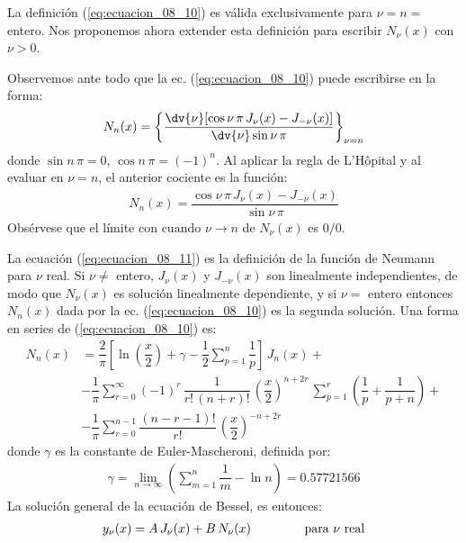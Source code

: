 \par
La definición (\ref{eq:ecuacion_08_10}) es válida exclusivamente para $\nu = n =$ entero. Nos proponemos ahora extender esta definición para escribir $N_{\nu} (x)$ con $\nu > 0$.
\par
Observemos ante todo que la ec. (\ref{eq:ecuacion_08_10}) puede escribirse en la forma:
\begin{align*}
N_{n} (x) =  \left\{ \dfrac{\displaystyle \dv{{\nu}} [\cos \nu \, \pi \, J_{\nu} (x) - J_{-\nu} (x)]}{\displaystyle \dv{\nu} \sin \nu \, \pi} \right\}_{\nu=n}
\end{align*}
donde $\sin n \, \pi = 0$, $\cos n \, \pi = (-1)^{n}$. Al aplicar la regla de L'Hôpital y al evaluar en $\nu = n$, el anterior cociente es la función:
\begin{align}
N_{n} (x) = \dfrac{\cos \nu \, \pi \, J_{\nu} (x) - J_{-\nu} (x)}{\sin \nu \, \pi}
\label{eq:ecuacion_08_11}
\end{align}
Obsérvese que el límite con cuando $\nu \to n$ de $N_{\nu} (x)$ es $0/0$.
\par
La ecuación (\ref{eq:ecuacion_08_11}) es la definición de la función de Neumann para $\nu$ real. Si $\nu \neq$ entero, $J_{\nu} (x)$ y $J_{-\nu} (x)$ son linealmente independientes, de modo que $N_{\nu}(x)$ es solución linealmente dependiente, y si $\nu =$ entero entonces $N_{n}(x)$ dada por la ec. (\ref{eq:ecuacion_08_10}) es la segunda solución. Una forma en series de (\ref{eq:ecuacion_08_10}) es:
\begin{align*}
N_{n}(x) &= \dfrac{2}{\pi} \left[ \ln \left(\dfrac{x}{2} \right) + \gamma - \dfrac{1}{2} \sum_{p=1}^{n} \dfrac{1}{p} \right] \, J_{n} (x) + \\[0.5em]
&- \dfrac{1}{\pi} \sum_{r=0}^{\infty} (-1)^{r} \, \dfrac{1}{r! \, (n + r)!} \, \left( \dfrac{x}{2} \right)^{n+2r} \, \sum_{p=1}^{r} \left( \dfrac{1}{p} + \dfrac{1}{p + n} \right) + \\[0.5em]
&- \dfrac{1}{\pi} \sum_{r=0}^{n-1} \dfrac{(n - r - 1)!}{r!} \, \left( \dfrac{x}{2} \right)^{-n+2r}
\end{align*}
donde $\gamma$ es la constante de Euler-Mascheroni, definida por:
\begin{align*}
\gamma = \lim_{n \to \infty} \left( \sum_{m=1}^{n} \dfrac{1}{m} - \ln n \right) = 0.57721566
\end{align*}
La solución general de la ecuación de Bessel, es entonces:
\begin{align*}
y_{\nu} (x) = A \, J_{\nu} (x) + B \, N_{\nu} (x) \hspace{1.5cm} \mbox{para $\nu$ real}
\end{align*}

